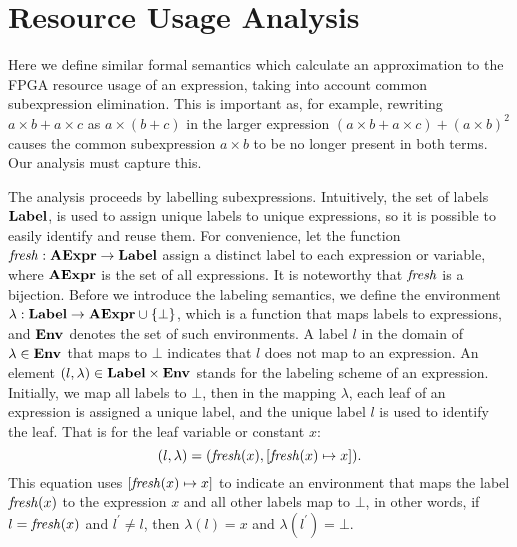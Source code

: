 \section{Resource Usage Analysis}
\label{so:sec:resource}

Here we define similar formal semantics which calculate an approximation to the
FPGA resource usage of an expression, taking into account common subexpression
elimination. This is important as, for example, rewriting $a \times b + a
\times c$ as $a \times (b + c)$ in the larger expression $(a \times b + a
\times c) + {(a \times b)}^2$ causes the common subexpression $a \times b$ to
be no longer present in both terms. Our analysis must capture this.

The analysis proceeds by labelling subexpressions. Intuitively, the
set of labels $\mathbf{Label}$, is used to assign unique labels to unique
expressions, so it is possible to easily identify and reuse them. For
convenience, let the function $\operatorname{\mathit{fresh}}: \mathbf{AExpr}\to\mathbf{Label}$ assign a
distinct label to each expression or variable, where $\mathbf{AExpr}$ is the set
of all expressions.  It is noteworthy that $\operatorname{\mathit{fresh}}$ is a bijection. Before
we introduce the labeling semantics, we define the environment $\lambda:
\mathbf{Label}\to\mathbf{AExpr}\cup\{\bot\}$, which is a function that maps labels to
expressions, and $\mathbf{Env}_{}$ denotes the set of such environments. A label $l$ in
the domain of $\lambda\in\mathbf{Env}_{}$ that maps to $\bot$ indicates that $l$ does
not map to an expression. An element $(l, \lambda)\in\mathbf{Label}\times\mathbf{Env}_{}$
stands for the labeling scheme of an expression. Initially, we map all labels
to $\bot$, then in the mapping $\lambda$, each leaf of an expression is
assigned a unique label, and the unique label $l$ is used to identify the leaf.
That is for the leaf variable or constant $x$:
\begin{equation}
    (l, \lambda) = (\operatorname{\mathit{fresh}}(x), [\operatorname{\mathit{fresh}}(x)\mapsto{x}]).
\end{equation}
This equation uses $[\operatorname{\mathit{fresh}}(x)\mapsto{x}]$ to indicate an environment that
maps the label $\operatorname{\mathit{fresh}}(x)$ to the expression $x$ and all other labels map
to $\bot$, in other words, if $l = \operatorname{\mathit{fresh}}(x)$ and $l^\prime \neq l$, then
$\lambda(l) = x$ and $\lambda(l^\prime) = \bot$.

